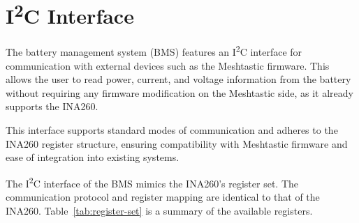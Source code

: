 \documentclass[11pt]{datasheet}
\begin{document}
\section{I\textsuperscript{2}C Interface}

The battery management system (BMS) features an I\textsuperscript{2}C
interface for communication with external devices such as the Meshtastic
firmware. This allows the user to read power, current, and voltage
information from the battery without requiring any firmware modification
on the Meshtastic side, as it already supports the INA260.

This interface supports standard modes of communication and adheres
to the INA260 register structure, ensuring compatibility with
Meshtastic firmware and ease of integration into existing systems.

The I\textsuperscript{2}C interface of the BMS mimics the INA260's
register set. The communication protocol and register mapping are
identical to that of the INA260. Table~\ref{tab:register-set}
is a summary of the available registers.
\end{document}
